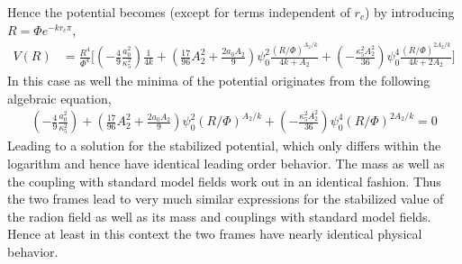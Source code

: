 \documentclass{article}
\begin{document}
Hence the potential becomes (except for terms independent of $r_{c}$) by introducing $R=\Phi e^{-kr_{c}\pi}$,
\begin{align}
V(R)&=\frac{R^{4}}{\Phi^{4}}
\Bigg[\left(-\frac{4}{9}\frac{a_{0}^{2}}{\kappa _{5}^{2}}\right)\frac{1}{4k}
+\left(\frac{17}{96}A_{2}^{2}+\frac{2a_{0}A_{2}}{9}\right)\psi _{0}^{2}\frac{(R/\Phi)^{A_{2}/k}}{4k+A_{2}}
+\left(-\frac{\kappa _{5}^{2}A_{2}^{2}}{36}\right)\psi _{0}^{4}\frac{(R/\Phi)^{2A_{2}/k}}{4k+2A_{2}}\Bigg]
\end{align}
In this case as well the minima of the potential originates from the following algebraic equation,
\begin{align}
\left(-\frac{4}{9}\frac{a_{0}^{2}}{\kappa _{5}^{2}}\right)
+\left(\frac{17}{96}A_{2}^{2}+\frac{2a_{0}A_{2}}{9}\right)\psi _{0}^{2}(R/\Phi)^{A_{2}/k}
+\left(-\frac{\kappa _{5}^{2}A_{2}^{2}}{36}\right)\psi _{0}^{4}(R/\Phi)^{2A_{2}/k}=0
\end{align}
Leading to a solution for the stabilized potential, which only differs within the logarithm and hence have identical leading order behavior. The mass as well as the coupling with standard model fields work out in an identical fashion. Thus the two frames lead to very much similar expressions for the stabilized value of the radion field as well as its mass and couplings with standard model fields. Hence at least in this context the two frames have nearly identical physical behavior. 



%

\end{document}
